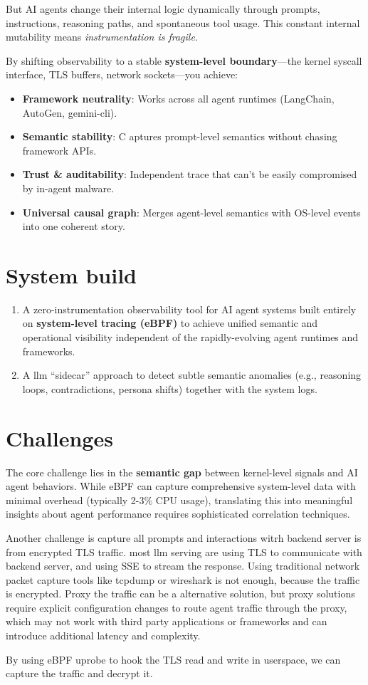 \documentclass[sigplan,screen，review,9pt]{acmart}
\begin{document}
But AI agents change their internal logic dynamically through prompts, instructions, reasoning paths, and spontaneous tool usage. This constant internal mutability means \emph{instrumentation is fragile}.

By shifting observability to a stable \textbf{system-level boundary}—the kernel syscall interface, TLS buffers, network sockets—you achieve:

\begin{itemize}
  \item \textbf{Framework neutrality}: Works across all agent runtimes (LangChain, AutoGen, gemini-cli).
  \item \textbf{Semantic stability}: C aptures prompt-level semantics without chasing framework APIs.
  \item \textbf{Trust \& auditability}: Independent trace that can’t be easily compromised by in-agent malware.
  \item \textbf{Universal causal graph}: Merges agent-level semantics with OS-level events into one coherent story.
\end{itemize}


\section*{System build}

\begin{enumerate}
  \item A zero-instrumentation observability tool for AI agent systems built entirely on \textbf{system-level tracing (eBPF)} to achieve unified semantic and operational visibility independent of the rapidly-evolving agent runtimes and frameworks.
  \item A llm ``sidecar'' approach to detect subtle semantic anomalies (e.g., reasoning loops, contradictions, persona shifts) together with the system logs.
\end{enumerate}

\section*{Challenges}

The core challenge lies in the \textbf{semantic gap} between kernel-level signals and AI agent behaviors. While eBPF can capture comprehensive system-level data with minimal overhead (typically 2-3\% CPU usage), translating this into meaningful insights about agent performance requires sophisticated correlation techniques.

Another challenge is capture all prompts and interactions witrh backend server is from encrypted TLS traffic. most llm serving are using TLS to communicate with backend server, and using SSE to stream the response. Using traditional network packet capture tools like tcpdump or wireshark is not enough, because the traffic is encrypted. Proxy the traffic can be a alternative solution, but proxy solutions require explicit configuration changes to route agent traffic through the proxy, which may not work with third party applications or frameworks and can introduce additional latency and complexity.

By using eBPF uprobe to hook the TLS read and write in userspace, we can capture the traffic and decrypt it.
\end{document}

